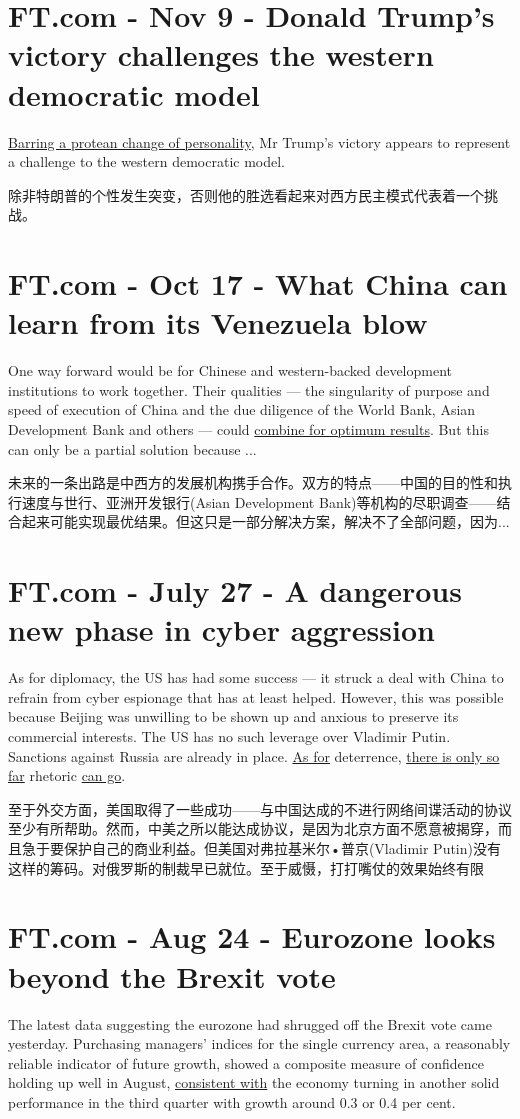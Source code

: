 \documentclass[UTF8]{ctexart}
\begin{document}
\section{FT.com - Nov 9 - Donald Trump's victory challenges the western democratic model}
\underline{Barring a protean change of personality}, Mr Trump’s victory appears to represent a challenge to the western democratic model.

除非特朗普的个性发生突变，否则他的胜选看起来对西方民主模式代表着一个挑战。

\section{FT.com - Oct 17 - What China can learn from its Venezuela blow}
One way forward would be for Chinese and western-backed development institutions to work together. Their qualities — the singularity of purpose and speed of execution of China and the due diligence of the World Bank, Asian Development Bank and others — could \underline{combine for optimum results}. But this can only be a partial solution because ...

未来的一条出路是中西方的发展机构携手合作。双方的特点——中国的目的性和执行速度与世行、亚洲开发银行(Asian Development Bank)等机构的尽职调查——结合起来可能实现最优结果。但这只是一部分解决方案，解决不了全部问题，因为...

\section{FT.com - July 27 - A dangerous new phase in cyber aggression}
As for diplomacy, the US has had some success — it struck a deal with China to refrain from cyber espionage that has at least helped. However, this was possible because Beijing was unwilling to be shown up and anxious to preserve its commercial interests. The US has no such leverage over Vladimir Putin. Sanctions against Russia are already in place. \underline{As for} deterrence, \underline{there is only so far} rhetoric \underline{can go}.

至于外交方面，美国取得了一些成功——与中国达成的不进行网络间谍活动的协议至少有所帮助。然而，中美之所以能达成协议，是因为北京方面不愿意被揭穿，而且急于要保护自己的商业利益。但美国对弗拉基米尔•普京(Vladimir Putin)没有这样的筹码。对俄罗斯的制裁早已就位。至于威慑，打打嘴仗的效果始终有限

\section{FT.com - Aug 24 - Eurozone looks beyond the Brexit vote}
The latest data suggesting the eurozone had shrugged off the Brexit vote came yesterday. Purchasing managers’ indices for the single currency area, a reasonably reliable indicator of future growth, showed a composite measure of confidence holding up well in August, \underline{consistent with} the economy turning in another solid performance in the third quarter with growth around 0.3 or 0.4 per cent.
\end{document}
